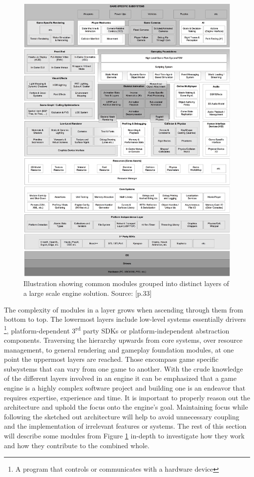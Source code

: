 \begin{figure}[h!]
	\centering \includegraphics[width=\linewidth]{PICs/engine_runtime_arch.jpg}
	\caption{Illustration showing common modules grouped into distinct layers of a large scale engine solution. Source: \cite{GEA_2}[p.33]}
	\label{fig:engine_runtime_arch}
\end{figure}

The complexity of modules in a layer grows when ascending through them from bottom to top. The lowermost layers include low-level systems essentially drivers \footnote{A program that controls or communicates with a hardware device}, platform-dependent 3\textsuperscript{rd} party \acp{SDK} or platform-independent abstraction components. Traversing the hierarchy upwards from core systems, over resource management, to general rendering and gameplay foundation modules, at one point the uppermost layers are reached. Those encompass game specific subsystems that can vary from one game to another. With the crude knowledge of the different layers involved in an engine it can be emphasized that a game engine is a highly complex software project and building one is an endeavor that requires expertise, experience and time. It is important to properly reason out the architecture and uphold the focus onto the engine's goal. Maintaining focus while following the sketched out architecture will help to avoid unnecessary coupling and the implementation of irrelevant features or systems. 
The rest of this section will describe some modules from Figure \ref{fig:engine_runtime_arch} in-depth to investigate how they work and how they contribute to the combined whole.

